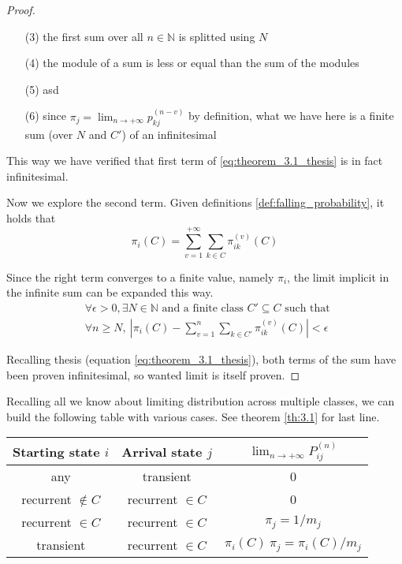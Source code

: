 \begin{proof}
\begin{itemize}
			\item [(3)] the first sum over all $n \in \mathbb{N}$ is splitted using $N$
			\item [(4)] the module of a sum is less or equal than the sum of the modules
			\item [(5)] asd
			\item [(6)] since $\pi_j = \lim_{n \to +\infty} p_{kj}^{(n-v)}$ by definition, what we have here is a finite sum (over $N$ and $C'$) of an infinitesimal
		\end{itemize}
		This way we have verified that first term of \ref{eq:theorem_3.1_thesis} is in fact infinitesimal.

		\bigbreak
		Now we explore the second term.
		Given definitions \ref{def:falling_probability}, it holds that
		$$ \pi_i(C) = \sum_{v = 1}^{+\infty} \sum_{k \in C} \pi_{ik}^{(v)}(C) $$

		\smallbreak
		Since the right term converges to a finite value, namely $\pi_i$, the limit implicit in the infinite sum can be expanded this way.
		\begin{equation}\begin{split} \label{eq:pi_limit_definition}
			& \forall \epsilon > 0, \exists N \in \mathbb{N} \text{ and a finite class } C' \subseteq C \text{ such that } \\
			& \forall n \ge N,~ \left| \pi_i(C) - \sum_{v = 1}^{n} \sum_{k \in C'} \pi_{ik}^{(v)}(C) \right| < \epsilon
		\end{split}\end{equation}

		\bigbreak
		Recalling thesis (equation \ref{eq:theorem_3.1_thesis}), both terms of the sum have been proven infinitesimal, so wanted limit is itself proven.
	\end{proof}

	Recalling all we know about limiting distribution across multiple classes, we can build the following table with various cases.
	See theorem \ref{th:3.1} for last line.
	\begin{center}\begin{tabular}{c|c|c}
		Starting state $i$ & Arrival state $j$ & $\lim_{n \to +\infty} P_{ij}^{(n)}$ \\ \hline
		any & transient & 0 \\
		recurrent $\notin C$ & recurrent $\in C$ & 0 \\
		recurrent $\in C$ & recurrent $\in C$ & $\pi_j = 1 / m_j$ \\
		transient & recurrent $\in C$ & $\pi_i(C)~\pi_j = \pi_i(C) / m_j$ \\
	\end{tabular}\end{center}

